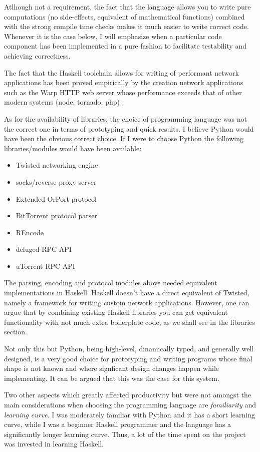 \documentclass[11pt]{book} %
\begin{document}
Atlhough not a requirement, the fact that the language allows you to write pure computations (no side-effects, equivalent of mathematical functions) combined with the strong compile time checks makes it much  easier to write correct code. Whenever it is the case below, I will emphasize when a particular code component has been implemented in a pure fashion to facilitate testability and achieving correctness.

The fact that the Haskell toolchain allows for writing of performant network applications has been proved empirically by the creation network applications such as the Warp HTTP web server whose performance exceeds that of other modern systems (node, tornado, php) \citep*{web:warpCrossBenchmark}.

As for the availability of libraries, the choice of programming language was not the correct one in terms of prototyping and quick results. I believe Python would have been the obvious correct choice. If I were to choose Python the following libraries/modules would have been available:


\begin{itemize}
\item Twisted networking engine 
\item socks/reverse proxy server
\item Extended OrPort protocol  
\item BitTorrent protocol parser
\item REncode
\item deluged RPC API 
\item uTorrent RPC API
\end{itemize}

The parsing, encoding and protocol modules above needed equivalent implementations in Haskell.  Haskell doesn't have a direct equivalent of Twisted, namely a framework for writing custom network applications. However, one can argue that by combining existing Haskell libraries you can get equivalent functionality with not much extra boilerplate code, as we shall see in the libraries section.

Not only this but Python, being high-level, dinamically typed, and generally well designed, is a very good choice for prototyping and writing programs whose final shape is not known and where signficant design changes happen while implementing. It can be argued that this was the case for this system.

Two other aspects which greatly affected productivity but were not amongst the main considerations when choosing the programming language are \textit{familiarity} and \textit{learning curve}. I was moderately familiar with Python and it has a short learning curve, while I was a beginner Haskell programmer and the language has a significantly longer learning curve. Thus, a lot of the time spent on the project was invested in learning Haskell.
\end{document}
